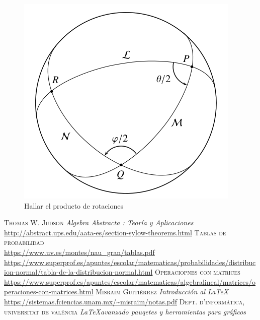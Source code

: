 \documentclass{article}
\numberwithin{equation}{section}
\theoremstyle{plain}  %
\begin{document}
    \begin{figure}[h]
        \centering
        \includegraphics[scale=0.5]{23.3-2.png}
        \caption{Hallar el producto de rotaciones}
        \end{figure}
\newpage
\begin{thebibliography}{X}
     \textsc{Thomas W. Judson }  \textit{Algebra Abstracta : Teoría y Aplicaciones} \\
    \url{http://abstract.ups.edu/aata-es/section-sylow-theorems.html}
     \textsc{Tablas de probabilidad} \\ 
    \url{https://www.uv.es/montes/nau_gran/tablas.pdf} \\ 
    \url{https://www.superprof.es/apuntes/escolar/matematicas/probabilidades/distribucion-normal/tabla-de-la-distribucion-normal.html}
     \textsc{Operaciopnes con matrices} \\ 
    \url{https://www.superprof.es/apuntes/escolar/matematicas/algebralineal/matrices/operaciones-con-matrices.html}
     \textsc{Misraim Guitiérrez} \textit{Introducción al \LaTeX} \\ 
    \url{https://sistemas.fciencias.unam.mx/~misraim/notas.pdf}
     \textsc{Dept. d'informática, universitat de valéncia } \textit{\LaTeX avanzado pauqetes y herramientas para gráficos} 
    \bibitem{}
\end{thebibliography}
\end{document}
